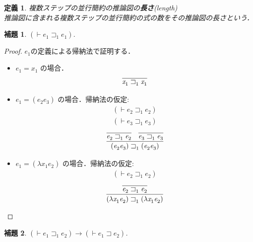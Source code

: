 \documentclass{ltjsbook}%
\newtheorem{lemma}{補題}[section]%
\newtheorem{definition}{定義}[section]%
\newcommand\term[2]{\textbf{#1}{(\textit{#2})}}%
\begin{document}
\begin{definition}%
  複数ステップの並行簡約の推論図の\term{長さ}{length}\\%
  推論図に含まれる複数ステップの並行簡約の式の数をその推論図の長さという．%
\end{definition}%
\begin{lemma}%
  \label{lemma:par1_reduct_id}%
  $(\vdash\mathit{e}_1^{}\sqsupset_1^{}\mathit{e}_1^{})$.%
\end{lemma}%
\begin{proof}%
  $\mathit{e}_1^{}$の定義による帰納法で証明する．%
  \begin{itemize}%
  \item $\mathit{e}_1^{}=\mathit{x}_1^{}$ の場合．%
    \begin{equation}%
      \infer{%
        \mathit{x}_1^{}\sqsupset_1^{}\mathit{x}_1^{}%
      }{%
      }%
    \end{equation}%
  \item $\mathit{e}_1^{}=(\mathit{e}_2^{}\mathit{e}_3^{})$ の場合．帰納法の仮定:%
    \begin{align}%
      (\vdash\mathit{e}_2^{}\sqsupset_1^{}\mathit{e}_2^{})\\%
      (\vdash\mathit{e}_3^{}\sqsupset_1^{}\mathit{e}_3^{})%
    \end{align}%
    \begin{equation}%
      \infer{%
        (\mathit{e}_2^{}\mathit{e}_3^{})\sqsupset_1^{}(\mathit{e}_2^{}\mathit{e}_3^{})%
      }{%
        \infer{%
          \mathit{e}_2^{}\sqsupset_1^{}\mathit{e}_2^{}%
        }{%
        }%
      &%
        \infer{%
          \mathit{e}_3^{}\sqsupset_1^{}\mathit{e}_3^{}%
        }{%
        }%
      }%
    \end{equation}%
  \item $\mathit{e}_1^{}=(\lambda\mathit{x}_1^{}\mathit{e}_2^{})$ の場合．帰納法の仮定:%
    \begin{align}%
      (\vdash\mathit{e}_2^{}\sqsupset_1^{}\mathit{e}_2^{})%
    \end{align}%
    \begin{equation}%
      \infer{%
        (\lambda\mathit{x}_1^{}\mathit{e}_2^{})\sqsupset_1^{}(\lambda\mathit{x}_1^{}\mathit{e}_2^{})%
      }{%
        \infer{%
          \mathit{e}_2^{}\sqsupset_1^{}\mathit{e}_2^{}%
        }{%
        }%
      }%
    \end{equation}%
  \end{itemize}%
\end{proof}%
\begin{lemma}%
  \label{lemma:par_reduct1n}%
  $(\vdash\mathit{e}_1^{}\sqsupset_1^{}\mathit{e}_2^{})\rightarrow%
  (\vdash\mathit{e}_1^{}\sqsupset\mathit{e}_2^{})$.%
\end{lemma}%
\end{document}
